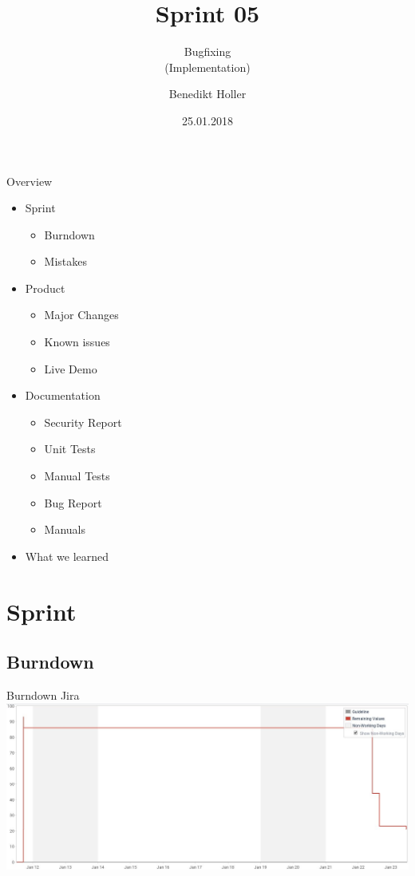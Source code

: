 \documentclass[aspectratio=1610,20pt,utf8]{beamer}
\title[Team Hams]{Sprint 05}
\subtitle{Bugfixing \\(Implementation)}
\author[\today]{Benedikt Holler}
\institute[Team Hams]
{
  Team Hams\\
  Leading Product Owner and Scrum Master\\
}
\date{25.01.2018}
\begin{document}
\begin{frame}[plain]
  \titlepage
\end{frame}

\begin{frame}{Overview}
\begin{itemize} \small
	\item Sprint
	\begin{itemize} \tiny
		\item Burndown
		\item Mistakes
	\end{itemize}
	\item Product
	\begin{itemize} \tiny
		\item Major Changes
		\item Known issues
		\item Live Demo
	\end{itemize}
	\item Documentation
	\begin{itemize} \tiny
		\item Security Report
		\item Unit Tests
		\item Manual Tests
		\item Bug Report
		\item Manuals
	\end{itemize}
	\item What we learned
\end{itemize}	
\end{frame}

\section{Sprint} 

\subsection{Burndown}
\begin{frame}{Burndown Jira}
	\centering
	\includegraphics[width=15cm]{img/s05_hams_jira_burndown.jpg}
\end{frame}
\end{document}

